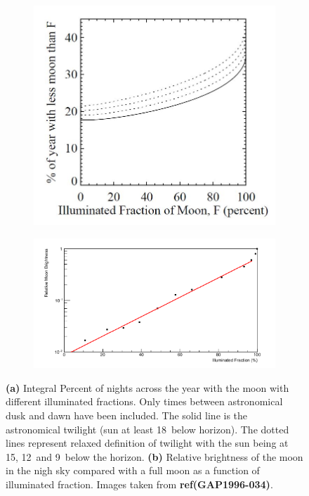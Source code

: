 \begin{figure}
\centering
\begin{subfigure}[b]{0.32\textwidth}
\includegraphics[width=\textwidth]{chapters/pix/SelEff/IlluminatedMoonFrac_Twilight.JPG}
\caption{}\label{fig:MoonYearlyFrac}
\end{subfigure}
\hspace*{3mm}
\begin{subfigure}[b]{0.555\textwidth}
\includegraphics[width=\textwidth]{chapters/pix/SelEff/RelMoonBright_Vs_IllumFrac_LogScale.pdf}
\caption{}\label{fig:MoonIllumFrac}
\end{subfigure}
\caption{\textbf{(a)} Integral Percent of nights across the year with the moon with different illuminated fractions. Only times between astronomical dusk and dawn have been included. The solid line is the astronomical twilight (sun at least 18\textdegree \ below horizon). The dotted lines represent relaxed definition of twilight with the sun being at 15\textdegree , 12\textdegree \ and 9\textdegree \ below the horizon. \textbf{(b)} Relative brightness of the moon in the nigh sky compared with a full moon as a function of illuminated fraction. Images taken from \textbf{ref{(GAP1996-034)}}. } 
\end{figure}

